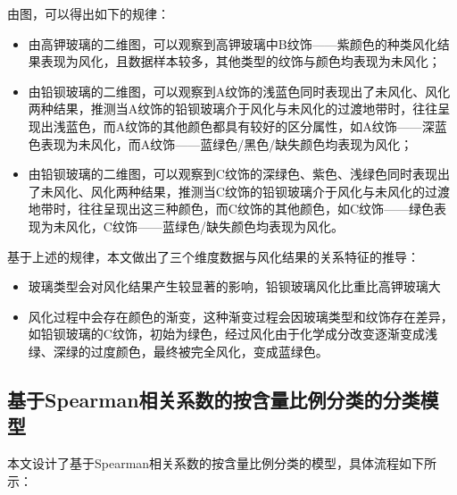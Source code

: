 \documentclass[withoutpreface,bwprint]{cumcmthesis} %
\begin{document}
由图，可以得出如下的规律：
\begin{itemize}
	\item 由高钾玻璃的二维图，可以观察到高钾玻璃中B纹饰——紫颜色的种类风化结果表现为风化，且数据样本较多，其他类型的纹饰与颜色均表现为未风化；
	\item 由铅钡玻璃的二维图，可以观察到A纹饰的浅蓝色同时表现出了未风化、风化两种结果，推测当A纹饰的铅钡玻璃介于风化与未风化的过渡地带时，往往呈现出浅蓝色，而A纹饰的其他颜色都具有较好的区分属性，如A纹饰——深蓝色表现为未风化，而A纹饰——蓝绿色/黑色/缺失颜色均表现为风化；
	\item 由铅钡玻璃的二维图，可以观察到C纹饰的深绿色、紫色、浅绿色同时表现出了未风化、风化两种结果，推测当C纹饰的铅钡玻璃介于风化与未风化的过渡地带时，往往呈现出这三种颜色，而C纹饰的其他颜色，如C纹饰——绿色表现为未风化，C纹饰——蓝绿色/缺失颜色均表现为风化。
\end{itemize}


基于上述的规律，本文做出了三个维度数据与风化结果的关系特征的推导：
\begin{itemize}
	\item 玻璃类型会对风化结果产生较显著的影响，铅钡玻璃风化比重比高钾玻璃大
	\item 风化过程中会存在颜色的渐变，这种渐变过程会因玻璃类型和纹饰存在差异，如铅钡玻璃的C纹饰，初始为绿色，经过风化由于化学成分改变逐渐变成浅绿、深绿的过度颜色，最终被完全风化，变成蓝绿色。
\end{itemize}


\subsection{基于Spearman相关系数的按含量比例分类的分类模型}

本文设计了基于Spearman相关系数的按含量比例分类的模型，具体流程如下所示：
\end{document}
